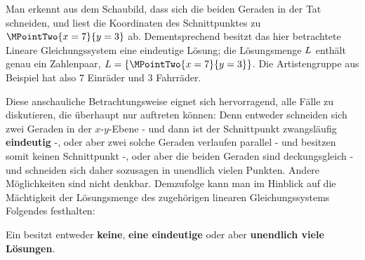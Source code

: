 \begin{MIntro}
\begin{MExample}
\begin{center}
{
}%
\end{center}
Man erkennt aus dem Schaubild, dass sich die beiden Geraden in der Tat schneiden, und liest
die Koordinaten des Schnittpunktes zu $\MPointTwo{x = 7}{y = 3}$ ab. Dementsprechend besitzt
das hier betrachtete Lineare Gleichungssystem eine eindeutige Lösung; die
Lösungsmenge $L$ enthält genau ein Zahlenpaar, ${\ML} = \{ \MPointTwo{x = 7}{y = 3} \}$.
Die Artistengruppe aus Beispiel  hat also $7$ Einräder und $3$ Fahrräder.%
\end{MExample}
Diese anschauliche Betrachtungsweise eignet sich hervorragend, alle Fälle zu
diskutieren, die überhaupt nur auftreten können: Denn entweder schneiden sich zwei Geraden in der $x$-$y$-Ebene -
und dann ist der Schnittpunkt zwangsläufig \textbf{eindeutig} -, oder aber zwei solche Geraden verlaufen parallel -
und besitzen somit keinen Schnittpunkt -, oder aber die beiden Geraden sind deckungsgleich -
und schneiden sich daher sozusagen in unendlich vielen Punkten. Andere Möglichkeiten sind nicht denkbar.
Demzufolge kann man im Hinblick auf die Mächtigkeit der Lösungsmenge des
zugehörigen linearen Gleichungssystems Folgendes festhalten:
\begin{MInfo}
Ein  besitzt entweder \textbf{keine}, \textbf{eine eindeutige} oder aber \textbf{unendlich viele Lösungen}. %


\end{MInfo}
\end{MIntro}

